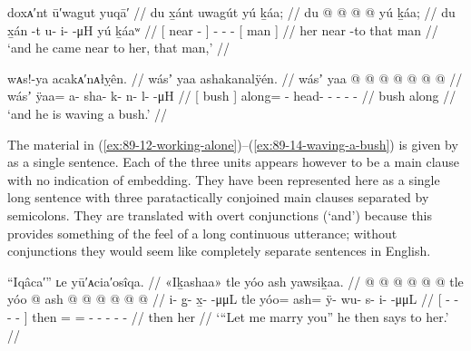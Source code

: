 \ex\label{ex:89-13-came-near-to-her}%
%
\begingl
	\glpreamble	doxᴀ′nt ū′wagut yuqā′ //
	\glpreamble	du x̱ánt uwagút yú ḵáa; //
	\gla	{} du  @ {} {}
		 @ {} @ {} @ {}
		{} yú ḵáa; {} //
	\glb	{} du x̱án -t {}
		u- i-  -μH
		{} yú ḵáaʷ {} //
	\glc	{}[  near - {}]
		- -  -
		{}[  man {}] //
	\gld	{} her near -to {}
		 {} {} {}
		{} that man {} //
	\glft	‘and he came near to her, that man,’
		//
\endgl
\xe

\ex\label{ex:89-14-waving-a-bush}%
%
\begingl
	\glpreamble	wᴀs!-ya acakᴀ′nᴀłỵên. //
	\glpreamble	wásʼ yaa ashakanalÿén.  //
	\gla	{} wásʼ {}
		yaa @  @ {} @ {} @ {} @ {} @ {} @ {} //
	\glb	{} wásʼ {}
		ÿaa= a- sha- k- n- l-  -μH //
	\glc	{}[ bush {}]
		along= - head- - - -  - //
	\gld	{} bush {}
		along  {} {} {} {} {} {} //
	\glft	‘and he is waving a bush.’
		//
\endgl
\xe

The material in (\ref{ex:89-12-working-alone})–(\ref{ex:89-14-waving-a-bush}) is given by \citeauthor{swanton:1909} as a single sentence.
Each of the three units appears however to be a main clause with no indication of embedding.
They have been represented here as a single long sentence with three paratactically conjoined main clauses separated by semicolons.
They are translated with overt conjunctions (‘and’) because this provides something of the feel of a long continuous utterance; without conjunctions they would seem like completely separate sentences in English.

\ex\label{ex:89-15-lemme-marry-you-he-says}%
%
\begingl
	\glpreamble	“Iqâca′” ʟe yū′ᴀcia′osîqa. //
	\glpreamble	«\!Iḵashaa\!» tle yóo ash yawsiḵaa. //
	\gla	{}  @ {} @ {} @ {} @ {} @ {} @ {} {}
		tle yóo @ ash @  @ {} @ {} @ {} @ {} @ {} //
	\glb	{} i- {} g̱- x̱-  -μμL {} {}
		tle yóo= ash= ÿ- wu- s- i-  -μμL //
	\glc	{}[ - \· - -
			 - \· {}]
		then = = - - - -
			 - //
	\gld	{}  {} {} {} {} {} {} {}
		then  her  {} {} {} {} {} //
	\glft	‘“Let me marry you” he then says to her.’
		//
\endgl
\xe

